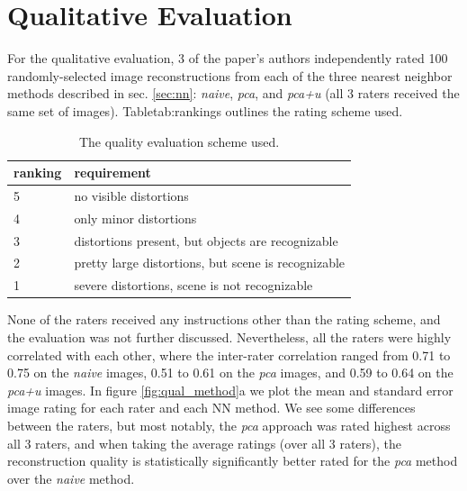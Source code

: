 
\section{Qualitative Evaluation}\label{sec:qual}

For the qualitative evaluation, 3 of the paper's authors independently rated 100 randomly-selected image reconstructions from each of the three nearest neighbor methods described in sec. \ref{sec:nn}: \emph{naive}, \emph{pca}, and \emph{pca+u} (all 3 raters received the same set of images). Table{tab:rankings} outlines the rating scheme used.

\begin{table}
\begin{tabular}{| l | l|}
 \hline
\textbf{ranking} & \textbf{requirement}  \\ \hline
5 & no visible distortions \\ \hline
4 & only minor distortions \\ \hline
3 & distortions present, but objects are recognizable  \\ \hline
2 & pretty large distortions, but scene is recognizable  \\ \hline
1 & severe distortions, scene is not recognizable  \\ \hline
\end{tabular}
\caption{The quality evaluation scheme used.}
\label{tabb:rankings}
\end{table}

None of the raters received any instructions other than the rating scheme, and the evaluation was not further discussed. Nevertheless, all the raters were highly correlated with each other, where the inter-rater correlation ranged from 0.71 to 0.75 on the \emph{naive} images, 0.51 to 0.61 on the \emph{pca} images, and 0.59 to 0.64 on the \emph{pca+u} images. In figure \ref{fig:qual_method}a we plot the mean and standard error image rating for each rater and each NN method. We see some differences between the raters, but most notably, the \emph{pca} approach was rated highest across all 3 raters, and when taking the average ratings (over all 3 raters), the reconstruction quality is statistically significantly better rated for the \emph{pca} method over the \emph{naive} method. 

